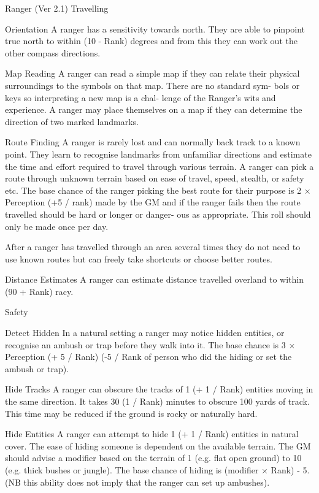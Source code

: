 \begin{Chapter}{Ranger (Ver 2.1)}
Travelling 

Orientation  A  ranger  has  a  sensitivity  towards 
north. They are able to pinpoint true north to within 
(10  -  Rank)  degrees  and  from  this  they  can  work 
out the other compass directions. 

Map  Reading  A  ranger  can  read  a  simple  map  if 
they  can  relate  their  physical  surroundings  to  the 
symbols  on  that  map.  There  are  no  standard  sym-
bols  or  keys  so  interpreting  a  new  map  is  a  chal-
lenge  of  the  Ranger’s  wits  and  experience.  A 
ranger may place themselves on a map if they can 
determine the direction of two marked landmarks. 

Route  Finding  A  ranger  is  rarely  lost  and  can 
normally  back  track  to  a  known  point.  They  learn 
to  recognise  landmarks  from  unfamiliar  directions 
and  estimate  the  time  and  effort  required  to  travel 
through  various  terrain.  A  ranger  can  pick  a  route 
through  unknown  terrain  based  on  ease  of  travel, 
speed, stealth, or safety etc. The base chance of the 
ranger picking the best route for their purpose is 2 
×  Perception  (+5  /  rank)%
made  by  the  GM  and  if  the  ranger  fails  then  the 
route travelled should be hard or longer or danger-
ous  as  appropriate.  This  roll  should  only  be  made 
once per day. 

After a ranger has travelled through an area several 
times they do not need to use known routes but can 
freely take shortcuts or choose better routes. 

Distance Estimates A ranger can estimate distance 
travelled  overland  to  within  (90  +  Rank)%
racy. 

Safety 

Detect  Hidden  In  a  natural  setting  a  ranger  may 
notice  hidden  entities,  or  recognise  an  ambush  or 
trap before they  walk into it. The base chance is 3 
× Perception (+ 5 / Rank) (-5 / Rank of person who 
did the hiding or set the ambush or trap). 

Hide Tracks A ranger can obscure the tracks of 1 
(+ 1 / Rank) entities moving in the same direction. 
It takes 30 (1 / Rank) minutes to obscure 100 yards 
of track. This time may be reduced if the ground is 
rocky or naturally hard. 

Hide Entities A ranger can attempt to hide 1 (+ 1 / 
Rank) entities in natural cover. The  ease of hiding 
someone is dependent on the available terrain. The 
GM  should  advise  a  modifier  based  on  the  terrain 
of 1 (e.g. flat open ground) to 10 (e.g. thick bushes 
or jungle). The base chance of hiding is (modifier × 
Rank) - 5. (NB this ability does not imply that the 
ranger can set up ambushes). 


\end{Chapter}
